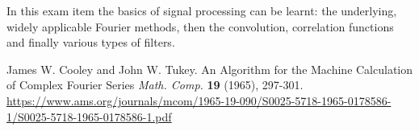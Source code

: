 \documentclass[12pt]{article}
\theoremstyle{plain}
\begin{document}
In this exam item the basics of signal processing can be learnt: the underlying, widely applicable Fourier methods, then the convolution, correlation functions and finally various types of filters. 

\newpage
\begin{thebibliography}{Nature}
%

\hypertarget{James W. Cooley and John W. Tukey (1965)}{}
James W. Cooley and John W. Tukey. An Algorithm for the Machine Calculation of Complex Fourier Series \textit{Math. Comp.} \textbf{19} (1965), 297-301. \url{https://www.ams.org/journals/mcom/1965-19-090/S0025-5718-1965-0178586-1/S0025-5718-1965-0178586-1.pdf}

\end{thebibliography}
\end{document}
